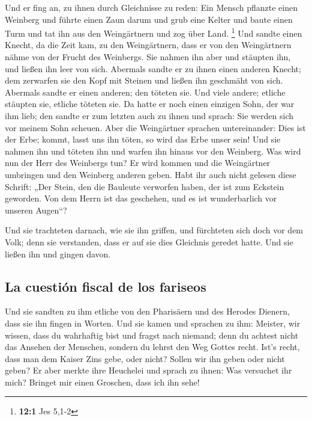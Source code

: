  Und er fing an, zu ihnen durch Gleichnisse zu reden: Ein
Mensch pflanzte einen Weinberg und führte einen Zaun darum und grub eine
Kelter und baute einen Turm und tat ihn aus den Weingärtnern und zog
über Land. \footnote{\textbf{12:1} Jes 5,1-2}  Und sandte
einen Knecht, da die Zeit kam, zu den Weingärtnern, dass er von den
Weingärtnern nähme von der Frucht des Weinbergs.  Sie
nahmen ihn aber und stäupten ihn, und ließen ihn leer von sich.
 Abermals sandte er zu ihnen einen anderen Knecht; dem
zerwarfen sie den Kopf mit Steinen und ließen ihn geschmäht von sich.
 Abermals sandte er einen anderen; den töteten sie. Und
viele andere; etliche stäupten sie, etliche töteten sie. 
Da hatte er noch einen einzigen Sohn, der war ihm lieb; den sandte er
zum letzten auch zu ihnen und sprach: Sie werden sich vor meinem Sohn
scheuen.  Aber die Weingärtner sprachen untereinander:
Dies ist der Erbe; kommt, lasst uns ihn töten, so wird das Erbe unser
sein!  Und sie nahmen ihn und töteten ihn und warfen ihn
hinaus vor den Weinberg.  Was wird nun der Herr des
Weinbergs tun? Er wird kommen und die Weingärtner umbringen und den
Weinberg anderen geben.  Habt ihr auch nicht gelesen
diese Schrift: „Der Stein, den die Bauleute verworfen haben, der ist zum
Eckstein geworden.  Von dem Herrn ist das geschehen, und
es ist wunderbarlich vor unseren Augen``?

 Und sie trachteten darnach, wie sie ihn griffen, und
fürchteten sich doch vor dem Volk; denn sie verstanden, dass er auf sie
dies Gleichnis geredet hatte. Und sie ließen ihn und gingen davon.

\hypertarget{la-cuestiuxf3n-fiscal-de-los-fariseos}{%
\subsection{La cuestión fiscal de los
fariseos}\label{la-cuestiuxf3n-fiscal-de-los-fariseos}}

 Und sie sandten zu ihm etliche von den Pharisäern und
des Herodes Dienern, dass sie ihn fingen in Worten.  Und
sie kamen und sprachen zu ihm: Meister, wir wissen, dass du wahrhaftig
bist und fragst nach niemand; denn du achtest nicht das Ansehen der
Menschen, sondern du lehrst den Weg Gottes recht. Ist's recht, dass man
dem Kaiser Zins gebe, oder nicht? Sollen wir ihn geben oder nicht geben?
 Er aber merkte ihre Heuchelei und sprach zu ihnen: Was
versuchet ihr mich? Bringet mir einen Groschen, dass ich ihn sehe!

